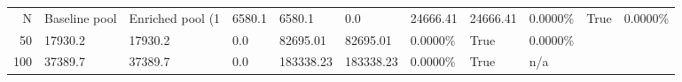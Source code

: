 \begin{tabular}{rllllllll}
\toprule
N & Baseline pool & Enriched pool (1%
 & 6580.1 & 6580.1 & 0.0 & 24666.41 & 24666.41 & 0.0000\% & True & 0.0000\% \\
50 & 17930.2 & 17930.2 & 0.0 & 82695.01 & 82695.01 & 0.0000\% & True & 0.0000\% \\
100 & 37389.7 & 37389.7 & 0.0 & 183338.23 & 183338.23 & 0.0000\% & True & n/a \\
\bottomrule
\end{tabular}
